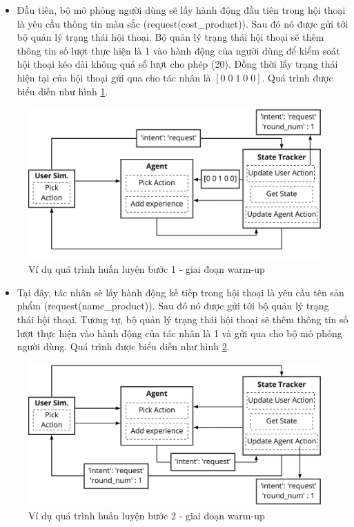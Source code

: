 \begin{itemize}
    \item Đầu tiên, bộ mô phỏng người dùng sẽ lấy hành động đầu tiên
    trong hội thoại là yêu cầu thông tin màu sắc (request(cost\_product)).
    Sau đó nó được gửi tới bộ quản lý trạng thái hội thoại. Bộ quản lý
    trạng thái hội thoại sẽ thêm thông tin số lượt thực hiện là 1 vào
    hành động của người dùng để kiểm soát hội thoại kéo dài không quá
    số lượt cho phép (20). Đồng thời lấy trạng thái hiện tại của hội thoại
    gửi qua cho tác nhân là $[0\; 0\; 1\; 0\; 0]$. Quá trình được
    biểu diễn như hình \ref{fig:examwarmup}.
\end{itemize}

\begin{figure}[ht!]
    \centering
    \includegraphics[scale=0.15]{thesis/chatbot/phuongphap/img/warmup_exam.jpg}
    \caption{Ví dụ quá trình huấn luyện bước 1 - giai đoạn warm-up}
    \label{fig:examwarmup}
\end{figure}

\begin{itemize}
    \item Tại đây, tác nhân sẽ lấy hành động kế tiếp trong hội thoại
    là yêu cầu tên sản phẩm (request(name\_product)). Sau đó nó được
    gửi tới bộ quản lý trạng thái hội thoại. Tương tự, bộ quản lý
    trạng thái hội thoại sẽ thêm thông tin số lượt thực hiện vào
    hành động của tác nhân là 1 và gửi qua cho bộ mô phỏng người dùng.
    Quá trình được biểu diễn như hình \ref{fig:examwarmup1}.
\end{itemize}

\begin{figure}[ht!]
    \centering
    \includegraphics[scale=0.15]{thesis/chatbot/phuongphap/img/warmup_exam1.jpeg}
    \caption{Ví dụ quá trình huấn luyện bước 2 - giai đoạn warm-up}
    \label{fig:examwarmup1}
\end{figure}

